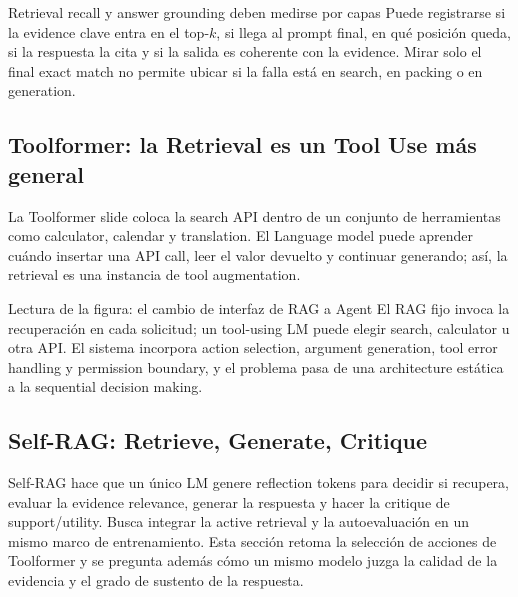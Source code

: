 \begin{warningbox}{Retrieval recall y answer grounding deben medirse por capas}
Puede registrarse si la evidence clave entra en el top-$k$, si llega al prompt final, en qué posición queda, si la respuesta la cita y si la salida es coherente con la evidence. Mirar solo el final exact match no permite ubicar si la falla está en search, en packing o en generation.
\end{warningbox}

\subsection{Toolformer: la Retrieval es un Tool Use más general}

La Toolformer slide coloca la search API dentro de un conjunto de herramientas como calculator, calendar y translation. El Language model puede aprender cuándo insertar una API call, leer el valor devuelto y continuar generando; así, la retrieval es una instancia de tool augmentation.


\begin{knowledgebox}{Lectura de la figura: el cambio de interfaz de RAG a Agent}
El RAG fijo invoca la recuperación en cada solicitud; un tool-using LM puede elegir search, calculator u otra API. El sistema incorpora action selection, argument generation, tool error handling y permission boundary, y el problema pasa de una architecture estática a la sequential decision making.
\end{knowledgebox}


\subsection{Self-RAG: Retrieve, Generate, Critique}

Self-RAG hace que un único LM genere reflection tokens para decidir si recupera, evaluar la evidence relevance, generar la respuesta y hacer la critique de support/utility. Busca integrar la active retrieval y la autoevaluación en un mismo marco de entrenamiento. Esta sección retoma la selección de acciones de Toolformer y se pregunta además cómo un mismo modelo juzga la calidad de la evidencia y el grado de sustento de la respuesta.

